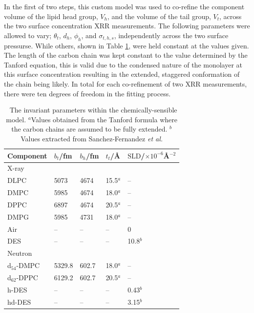 \documentclass[twoside,twocolumn,9pt]{article}
\begin{document}
In the first of two steps, this custom model was used to co-refine the component volume of the lipid head group, $V_h$, and the volume of the tail group, $V_t$, across the two surface concentration XRR measurements. The following parameters were allowed to vary; $\theta_t$, $d_h$, $\phi_h$, and $\sigma_{t,h,s}$, independently across the two surface pressurse. While others, shown in Table \ref{tab:invariant}, were held constant at the values given. The length of the carbon chain was kept constant to the value determined by the Tanford equation,\cite{Tanford1980} this is valid due to the condensed nature of the monolayer at this surface concentration resulting in the extended, staggered conformation of the chain being likely. In total for each co-refinement of two XRR measurements, there were ten degrees of freedom in the fitting process. 

\begin{table}[h]
	\small
	\caption{\ The invariant parameters within the chemically-sensible model. 
	$^a$Values obtained from the Tanford formula where the carbon chains are assumed to be fully extended.\cite{Tanford1980} $^b$Values extracted from Sanchez-Fernandez \emph{et al.}\cite{Sanchez-Fernandez2016}}
	\label{tab:invariant}
	\begin{tabular*}{0.48\textwidth}{@{\extracolsep{\fill}}lllll}
		\hline
		Component & $b_t$/fm & $b_h$/fm & $t_t$/\AA & $\text{SLD}$/$\times10^{-6}$\AA$^{-2}$ \\
		\hline
		X-ray & & & & \\
		DLPC & 5073 & 4674 & 15.5$^a$ & -- \\
		DMPC & 5985 & 4674 & 18.0$^a$ & -- \\
		DPPC & 6897 & 4674 & 20.5$^a$ & -- \\
		DMPG & 5985 & 4731 & 18.0$^a$ & --\\
		Air & -- & -- & -- & 0\\
		DES & -- & -- & -- & 10.8$^b$ \\
		\hline
		Neutron & & & & \\
		d$_{54}$-DMPC & 5329.8 & 602.7 & 18.0$^a$ & -- \\
		d$_{62}$-DPPC & 6129.2 & 602.7 & 20.5$^a$ & -- \\
		h-DES & -- & -- & -- & 0.43$^b$  \\
		hd-DES & -- & -- & -- & 3.15$^b$ \\
		\hline
	\end{tabular*}
\end{table}
\end{document}
